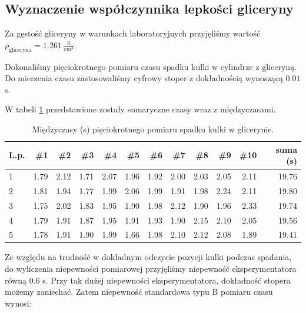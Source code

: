 \documentclass[a4paper]{article}
\newlength{\du}
\begin{document}
\subsection{Wyznaczenie współczynnika lepkości gliceryny}

Za gęstość gliceryny w warunkach laboratoryjnych przyjęliśmy wartość $\rho_\text{gliceryna} = 1.261 \, \frac{\text{g}}{\text{cm}^3}$.

Dokonaliśmy pięciokrotnego pomiaru czasu spadku kulki w cylindrze z gliceryną.
Do mierzenia czasu zastosowaliśmy cyfrowy stoper z dokładnością wynoszącą $0.01$ s.

W tabeli \ref{gliceryna} przedstawione zostały sumaryczne czasy wraz z międzyczasami.

\begin{table}[h!]
	\centering
		\begin{tabular}{lrrrrrrrrrrr}
			\toprule
			L.p. &  \#1 & \#2 & \#3 & \#4 & \#5 & \#6 & \#7 & \#8 & \#9 & \#10 & suma (s)\\
			\midrule
			1 &           1.79 &           2.12 &           1.71 &           2.07 &           1.96 &           1.92 &           2.00 &           2.03 &           2.05 &            2.11 & 19.76 \\
			2 &           1.81 &           1.94 &           1.77 &           1.99 &           2.06 &           1.99 &           1.91 &           1.98 &           2.24 &            2.11 & 19.80 \\
			3 &           1.75 &           2.02 &           1.83 &           1.95 &           1.90 &           1.98 &           2.12 &           1.90 &           1.96 &            2.33 & 19.74 \\
			4 &           1.79 &           1.91 &           1.87 &           1.95 &           1.91 &           1.93 &           1.90 &           2.15 &           2.10 &            2.05 & 19.56 \\
			5 &           1.78 &           1.91 &           1.90 &           1.99 &           1.66 &           1.98 &           2.10 &           2.12 &           2.08 &            1.89 & 19.41 \\
			\bottomrule
		\end{tabular}
	\caption{Międzyczasy (s) pięciokrotnego pomiaru spadku kulki w glicerynie.}
	\label{gliceryna}
\end{table}

Ze względu na trudność w dokładnym odczycie pozycji kulki podczas spadania, do wyliczenia niepewności pomiarowej przyjęliśmy niepewność eksperymentatora równą $0.6$ s.
Przy tak dużej niepewności eksperymentatora, dokładność stopera możemy zaniechać.
Zatem niepewność standardowa typu B pomiaru czasu wynosi:
\end{document}
